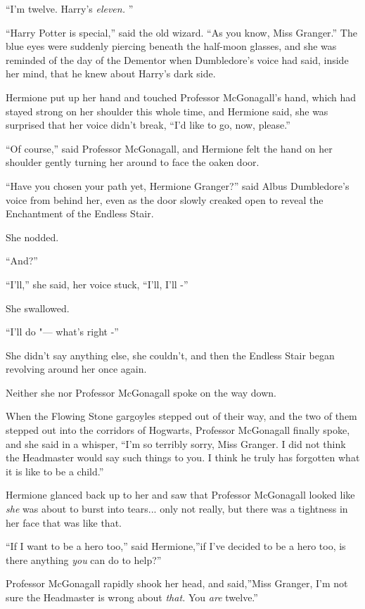 ``I'm twelve. Harry's \emph{eleven.} ''

``Harry Potter is special,'' said the old wizard. ``As you know, Miss
Granger.'' The blue eyes were suddenly piercing beneath the half-moon
glasses, and she was reminded of the day of the Dementor when
Dumbledore's voice had said, inside her mind, that he knew about Harry's
dark side.

Hermione put up her hand and touched Professor McGonagall's hand, which
had stayed strong on her shoulder this whole time, and Hermione said,
she was surprised that her voice didn't break, ``I'd like to go, now,
please.''

``Of course,'' said Professor McGonagall, and Hermione felt the hand on
her shoulder gently turning her around to face the oaken door.

``Have you chosen your path yet, Hermione Granger?'' said Albus
Dumbledore's voice from behind her, even as the door slowly creaked open
to reveal the Enchantment of the Endless Stair.

She nodded.

``And?''

``I'll,'' she said, her voice stuck, ``I'll, I'll -''

She swallowed.

``I'll do "--- what's right -''

She didn't say anything else, she couldn't, and then the Endless Stair
began revolving around her once again.

Neither she nor Professor McGonagall spoke on the way down.

When the Flowing Stone gargoyles stepped out of their way, and the two
of them stepped out into the corridors of Hogwarts, Professor McGonagall
finally spoke, and she said in a whisper, ``I'm so terribly sorry, Miss
Granger. I did not think the Headmaster would say such things to you. I
think he truly has forgotten what it is like to be a child.''

Hermione glanced back up to her and saw that Professor McGonagall looked
like \emph{she} was about to burst into tears... only not really,
but there was a tightness in her face that was like that.

``If I want to be a hero too,'' said Hermione,''if I've decided to be a
hero too, is there anything \emph{you} can do to help?''

Professor McGonagall rapidly shook her head, and said,''Miss Granger,
I'm not sure the Headmaster is wrong about \emph{that.} You \emph{are}
twelve.''

